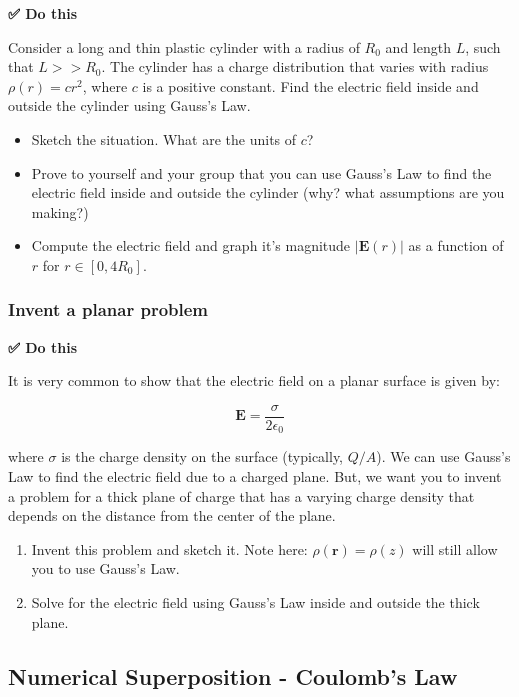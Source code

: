 \textbf{✅ Do this}

Consider a long and thin plastic cylinder with a radius of \(R_0\) and
length \(L\), such that \(L>>R_0\). The cylinder has a charge
distribution that varies with radius \(\rho(r) = cr^2\), where \(c\) is
a positive constant. Find the electric field inside and outside the
cylinder using Gauss's Law.

\begin{itemize}
\tightlist
\item
  Sketch the situation. What are the units of \(c\)?
\item
  Prove to yourself and your group that you can use Gauss's Law to find
  the electric field inside and outside the cylinder (why? what
  assumptions are you making?)
\item
  Compute the electric field and graph it's magnitude
  \(|\mathbf{E}(r)|\) as a function of \(r\) for \(r \in [0,4R_0]\).
\end{itemize}

\subsubsection{Invent a planar problem}\label{invent-a-planar-problem}

\textbf{✅ Do this}

It is very common to show that the electric field on a planar surface is
given by:

\[\mathbf{E} = \dfrac{\sigma}{2\epsilon_0}\]

where \(\sigma\) is the charge density on the surface (typically,
\(Q/A\)). We can use Gauss's Law to find the electric field due to a
charged plane. But, we want you to invent a problem for a thick plane of
charge that has a varying charge density that depends on the distance
from the center of the plane.

\begin{enumerate}
\def\labelenumi{\arabic{enumi}.}
\tightlist
\item
  Invent this problem and sketch it. Note here:
  \(\rho(\mathbf{r}) = \rho(z)\) will still allow you to use Gauss's
  Law.
\item
  Solve for the electric field using Gauss's Law inside and outside the
  thick plane.
\end{enumerate}

\subsection{Numerical Superposition - Coulomb's
Law}\label{numerical-superposition---coulombs-law}

